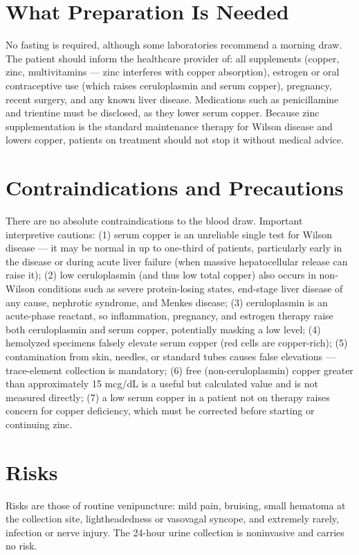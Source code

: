 \section*{What Preparation Is Needed}
No fasting is required, although some laboratories recommend a morning draw. The patient should inform the healthcare provider of: all supplements (copper, zinc, multivitamins --- zinc interferes with copper absorption), estrogen or oral contraceptive use (which raises ceruloplasmin and serum copper), pregnancy, recent surgery, and any known liver disease. Medications such as penicillamine and trientine must be disclosed, as they lower serum copper. Because zinc supplementation is the standard maintenance therapy for Wilson disease and lowers copper, patients on treatment should not stop it without medical advice.

\section*{Contraindications and Precautions}
There are no absolute contraindications to the blood draw. Important interpretive cautions: (1) serum copper is an unreliable single test for Wilson disease --- it may be normal in up to one-third of patients, particularly early in the disease or during acute liver failure (when massive hepatocellular release can raise it); (2) low ceruloplasmin (and thus low total copper) also occurs in non-Wilson conditions such as severe protein-losing states, end-stage liver disease of any cause, nephrotic syndrome, and Menkes disease; (3) ceruloplasmin is an acute-phase reactant, so inflammation, pregnancy, and estrogen therapy raise both ceruloplasmin and serum copper, potentially masking a low level; (4) hemolyzed specimens falsely elevate serum copper (red cells are copper-rich); (5) contamination from skin, needles, or standard tubes causes false elevations --- trace-element collection is mandatory; (6) free (non-ceruloplasmin) copper greater than approximately 15 mcg/dL is a useful but calculated value and is not measured directly; (7) a low serum copper in a patient not on therapy raises concern for copper deficiency, which must be corrected before starting or continuing zinc.

\section*{Risks}
Risks are those of routine venipuncture: mild pain, bruising, small hematoma at the collection site, lightheadedness or vasovagal syncope, and extremely rarely, infection or nerve injury. The 24-hour urine collection is noninvasive and carries no risk.

